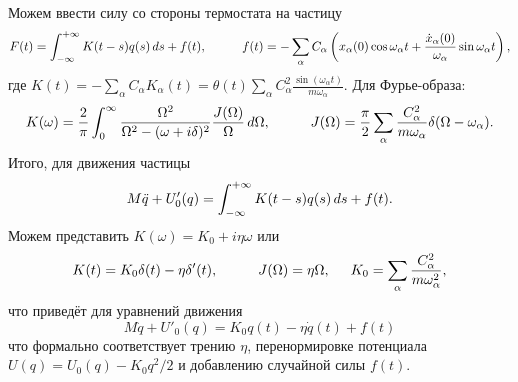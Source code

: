 Можем ввести силу со стороны термостата на частицу
\begin{equation*}
	F(t) = \int_{-\infty}^{+\infty} K(t-s) q(s) \d s + f(t),
	\hspace{10 mm} 
	f(t) = - \sum_\alpha C_\alpha \left(
		x_\alpha(0) \cos \omega_\alpha t + \frac{\dot{x}_\alpha(0)}{\omega_\alpha} \sin \omega_\alpha t
	\right),
\end{equation*}
где $K(t)= - \sum_\alpha C_\alpha K_\alpha(t) = \theta(t) \sum_\alpha C_\alpha^2 \frac{\sin (\omega_\alpha t)}{m \omega_\alpha}$. Для Фурье-образа:
\begin{equation*}
	K(\omega) = \frac{2}{\pi} \int_{0}^{\infty}  \frac{\Omega^2}{\Omega^2- (\omega+i\delta)^2} \frac{J(\Omega)}{\Omega} \d \Omega,
	\hspace{10 mm} 
	J(\Omega) = \frac{\pi}{2} \sum_\alpha \frac{C_\alpha^2}{m \omega_\alpha} \delta(\Omega-\omega_\alpha).
\end{equation*}
Итого, для движения частицы
\begin{equation*}
	M \ddot{q} + U'_0 (q) = \int_{-\infty}^{+\infty} K(t-s) q(s) \, d s + f(t).
\end{equation*}
Можем представить $K(\omega) = K_0 + i \eta \omega$ или
\begin{equation*}
	K(t) = K_0 \delta(t) - \eta \delta'(t), 
	\hspace{10 mm} 
	J(\Omega) = \eta \Omega, 
	\hspace{5 mm} 
	K_0 = \sum_\alpha \frac{C_\alpha^2}{m \omega_\alpha^2},
\end{equation*}
что приведёт для уравнений движения
\begin{equation}
\boxed{
	M \ddot{q} + U'_0 (q) = K_0 q(t) - \eta \dot{q}(t) + f(t)
}
\end{equation}
что формально соответствует трению $\eta$, перенормировке потенциала $U(q) = U_0 (q) - K_0 q^2/2$ и добавлению случайной силы $f(t)$. 

